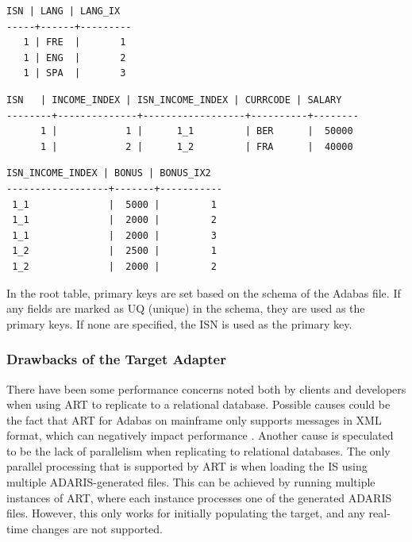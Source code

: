 \newpage
\begin{lstlisting}[frame=tb,caption={Query result of the MU field LANG in the relational table EMPL\_LANG},label=lst:bonusmuquery]
 ISN | LANG | LANG_IX
-----+------+---------
   1 | FRE  |       1
   1 | ENG  |       2
   1 | SPA  |       3
\end{lstlisting}

\begin{lstlisting}[frame=tb,caption={Query result of the PE field INCOME in the relational table EMPL\_INCOME},label=lst:incomepequery]
  ISN   | INCOME_INDEX | ISN_INCOME_INDEX | CURRCODE | SALARY
--------+--------------+------------------+----------+--------
      1 |            1 |      1_1         | BER      |  50000
      1 |            2 |      1_2         | FRA      |  40000
\end{lstlisting}
\begin{lstlisting}[frame=tb,caption={Query result of the MU field BONUS in the PE field INCOME in the relational table EMPL\_INCOME\_BONUS},label=lst:bonusmupequery]
 ISN_INCOME_INDEX | BONUS | BONUS_IX2
------------------+-------+-----------
 1_1              |  5000 |         1
 1_1              |  2000 |         2
 1_1              |  2000 |         3
 1_2              |  2500 |         1
 1_2              |  2000 |         2
\end{lstlisting}

In the root table, primary keys are set based on the schema of the Adabas file. If any fields are marked as UQ (unique) in the schema, they are used as the primary keys. If none are specified, the \ac{ISN} is used as the primary key.

\subsubsection{Drawbacks of the Target Adapter}
\label{ch02:fundamentals:adabas:art:limitations}
There have been some performance concerns noted both by clients and developers when using \ac{ART} to replicate to a relational database. Possible causes could be the fact that \ac{ART} for Adabas on mainframe only supports messages in XML format, which can negatively impact performance \cite{nicola2003xml}. Another cause is speculated to be the lack of parallelism when replicating to relational databases. The only parallel processing that is supported by \ac{ART} is when loading the \ac{IS} using multiple ADARIS-generated files. This can be achieved by running multiple instances of \ac{ART}, where each instance processes one of the generated ADARIS files. However, this only works for initially populating the target, and any real-time changes are not supported.

